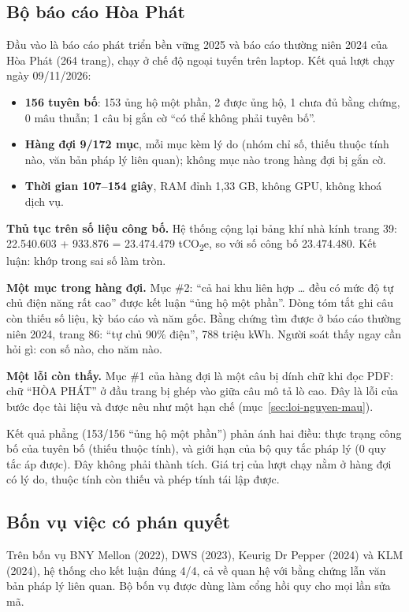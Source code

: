 \subsection{Bộ báo cáo Hòa Phát}

Đầu vào là báo cáo phát triển bền vững 2025 và báo cáo thường niên 2024 của Hòa Phát (264 trang), chạy ở chế độ ngoại tuyến trên laptop. Kết quả lượt chạy ngày 09/11/2026:
\begin{itemize}
\item \textbf{156 tuyên bố}: 153 ủng hộ một phần, 2 được ủng hộ, 1 chưa đủ bằng chứng, 0 mâu thuẫn; 1 câu bị gắn cờ “có thể không phải tuyên bố”.
\item \textbf{Hàng đợi 9/172 mục}, mỗi mục kèm lý do (nhóm chỉ số, thiếu thuộc tính nào, văn bản pháp lý liên quan); không mục nào trong hàng đợi bị gắn cờ.
\item \textbf{Thời gian 107–154 giây}, RAM đỉnh 1,33 GB, không GPU, không khoá dịch vụ.
\end{itemize}

\textbf{Thủ tục trên số liệu công bố.} Hệ thống cộng lại bảng khí nhà kính trang 39: 22.540.603 + 933.876 = 23.474.479 tCO\textsubscript{2}e, so với số công bố 23.474.480. Kết luận: khớp trong sai số làm tròn.

\textbf{Một mục trong hàng đợi.} Mục \#2: “cả hai khu liên hợp … đều có mức độ tự chủ điện năng rất cao” được kết luận “ủng hộ một phần”. Dòng tóm tắt ghi câu còn thiếu số liệu, kỳ báo cáo và năm gốc. Bằng chứng tìm được ở báo cáo thường niên 2024, trang 86: “tự chủ 90\% điện”, 788 triệu kWh. Người soát thấy ngay cần hỏi gì: con số nào, cho năm nào.

\textbf{Một lỗi còn thấy.} Mục \#1 của hàng đợi là một câu bị dính chữ khi đọc PDF: chữ “HÒA PHÁT” ở đầu trang bị ghép vào giữa câu mô tả lò cao. Đây là lỗi của bước đọc tài liệu và được nêu như một hạn chế (mục~\ref{sec:loi-nguyen-mau}).

Kết quả phẳng (153/156 “ủng hộ một phần”) phản ánh hai điều: thực trạng công bố của tuyên bố (thiếu thuộc tính), và giới hạn của bộ quy tắc pháp lý (0 quy tắc áp được). Đây không phải thành tích. Giá trị của lượt chạy nằm ở hàng đợi có lý do, thuộc tính còn thiếu và phép tính tái lập được.

\subsection{Bốn vụ việc có phán quyết}

Trên bốn vụ BNY Mellon (2022), DWS (2023), Keurig Dr Pepper (2024) và KLM (2024), hệ thống cho kết luận đúng 4/4, cả về quan hệ với bằng chứng lẫn văn bản pháp lý liên quan. Bộ bốn vụ được dùng làm cổng hồi quy cho mọi lần sửa mã.

